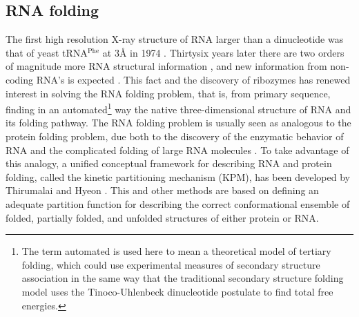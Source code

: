 \subsection{RNA folding}
The first  high resolution X-ray structure  of RNA larger
than a dinucleotide was  that of yeast tRNA$^{\textrm{Phe}}$ at 3{\AA}
in 1974 \cite{robertus1974, kim1974}.  Thirtysix years later there are
two   orders   of    magnitude   more   RNA   structural   information
\cite{noller2005},  and  new  information  from  non-coding  RNA's  is
expected  \cite{weinberg2009}.    This  fact  and   the  discovery  of
ribozymes  \cite{kruger1982,  takada1983}   has  renewed  interest  in
solving  the RNA  folding problem,  that is,  from
primary sequence, finding  in an automated\footnote{The term automated
  is used here to mean  a theoretical model of tertiary folding, which
  could use  experimental measures of  secondary structure association
  in  the same way  that the  traditional secondary  structure folding
  model  \cite{zuker1989,   hofacker1994}  uses  the  Tinoco-Uhlenbeck
  dinucleotide   postulate  \cite{borer1974}   to   find  total   free
  energies.} way the native three-dimensional structure of RNA and its
folding pathway. The RNA folding problem is usually
seen  as analogous to  the protein  folding problem,  due both  to the
discovery   of  the  enzymatic   behavior  of   RNA  \cite{kruger1982,
  takada1983}  and  the complicated  folding  of  large RNA  molecules
\cite{batey1999}.   To  take  advantage  of this  analogy,  a  unified
conceptual framework  for describing  RNA and protein  folding, called
the  kinetic  partitioning  mechanism  (KPM), has  been  developed  by
Thirumalai and Hyeon \cite{thirumalai2005}. This and other methods are
based on  defining an adequate  partition function for  describing the
correct  conformational  ensemble  of  folded, partially  folded,  and
unfolded  structures   \cite{chen1995,  chen1998,  thirumalai1996}  of
either protein or RNA.

